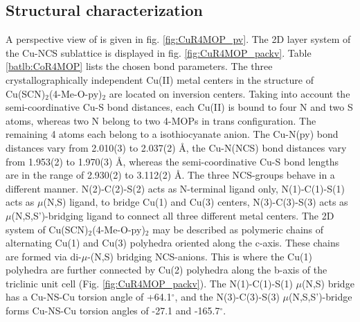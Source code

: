 \subsection{Structural characterization}
A perspective view of  is given in fig. \ref{fig:CuR4MOP_pv}. The 2D layer system of the Cu-NCS sublattice is displayed in fig. \ref{fig:CuR4MOP_packv}. Table \ref{batlb:CoR4MOP} lists the chosen bond parameters. The three crystallographically independent Cu(II) metal centers in the structure of Cu(SCN)$_2$(4-Me-O-py)$_2$ are located on inversion centers. Taking into account the semi-coordinative Cu-S bond distances, each Cu(II) is bound to four N and two S atoms, whereas two N belong to two 4-MOPs in trans configuration. The remaining 4 atoms each belong to a isothiocyanate anion. The Cu-N(py) bond distances vary from 2.010(3) to 2.037(2) \AA, the Cu-N(NCS) bond distances vary from 1.953(2) to 1.970(3) \AA, whereas the semi-coordinative Cu-S bond lengths are in the range of 2.930(2) to 3.112(2) \AA. The three NCS-groups behave in a different manner. N(2)-C(2)-S(2) acts as N-terminal ligand only, N(1)-C(1)-S(1) acts as  $\mu$(N,S) ligand, to bridge Cu(1) and Cu(3) centers, N(3)-C(3)-S(3) acts as $\mu$(N,S,S’)-bridging ligand to connect all three different metal centers. The 2D system of Cu(SCN)$_2$(4-Me-O-py)$_2$ may be described as polymeric chains of alternating Cu(1) and Cu(3) polyhedra oriented along the c-axis. These chains are formed via di-$\mu$-(N,S) bridging NCS-anions. This is where the Cu(1) polyhedra are further connected by Cu(2) polyhedra along the b-axis of the triclinic unit cell (Fig. \ref{fig:CuR4MOP_packv}). The N(1)-C(1)-S(1) $\mu$(N,S) bridge has a Cu-N\ce{***}S-Cu torsion angle of +64.1$^\circ$, and the N(3)-C(3)-S(3) $\mu$(N,S,S’)-bridge forms Cu-N\ce{***}S-Cu torsion angles of  -27.1 and -165.7$^\circ$. 


